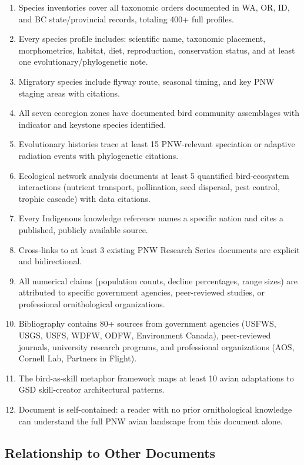 \documentclass[11pt,letterpaper]{article}
\begin{document}
\begin{enumerate}[leftmargin=2em]
\item Species inventories cover all taxonomic orders documented in WA, OR, ID, and BC state/provincial records, totaling 400+ full profiles.
\item Every species profile includes: scientific name, taxonomic placement, morphometrics, habitat, diet, reproduction, conservation status, and at least one evolutionary/phylogenetic note.
\item Migratory species include flyway route, seasonal timing, and key PNW staging areas with citations.
\item All seven ecoregion zones have documented bird community assemblages with indicator and keystone species identified.
\item Evolutionary histories trace at least 15 PNW-relevant speciation or adaptive radiation events with phylogenetic citations.
\item Ecological network analysis documents at least 5 quantified bird-ecosystem interactions (nutrient transport, pollination, seed dispersal, pest control, trophic cascade) with data citations.
\item Every Indigenous knowledge reference names a specific nation and cites a published, publicly available source.
\item Cross-links to at least 3 existing PNW Research Series documents are explicit and bidirectional.
\item All numerical claims (population counts, decline percentages, range sizes) are attributed to specific government agencies, peer-reviewed studies, or professional ornithological organizations.
\item Bibliography contains 80+ sources from government agencies (USFWS, USGS, USFS, WDFW, ODFW, Environment Canada), peer-reviewed journals, university research programs, and professional organizations (AOS, Cornell Lab, Partners in Flight).
\item The bird-as-skill metaphor framework maps at least 10 avian adaptations to GSD skill-creator architectural patterns.
\item Document is self-contained: a reader with no prior ornithological knowledge can understand the full PNW avian landscape from this document alone.
\end{enumerate}

\subsection{Relationship to Other Documents}
\end{document}
